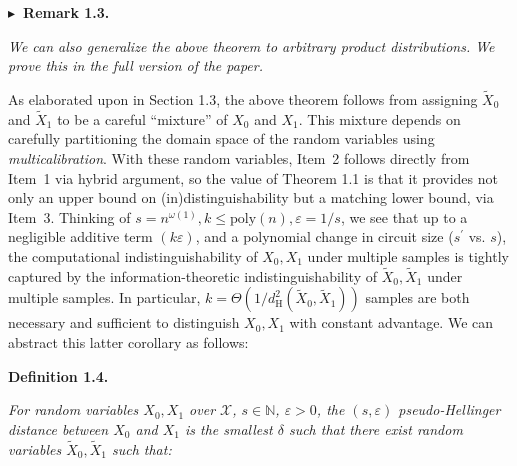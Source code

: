 \documentclass[10pt,a4paper]{article}
\begin{document}




\par\medskip\noindent\textbf{
$\blacktriangleright$ Remark 1.3.
}\par



\emph{We can also generalize the above theorem to arbitrary product distributions. We prove this in the full version of the paper.}\par






As elaborated upon in Section 1.3, the above theorem follows from assigning $\widetilde{X}_{0}$ and $\widetilde{X}_{1}$ to be a careful “mixture” of $X_{0}$ and $X_{1}$. This mixture depends on carefully partitioning the domain space of the random variables using \emph{multicalibration}. With these random variables, Item 2 follows directly from Item 1 via hybrid argument, so the value of Theorem 1.1 is that it provides not only an upper bound on (in)distinguishability but a matching lower bound, via Item 3.
Thinking of $s=n^{\omega(1)},k\leq\mathrm{poly}(n),\varepsilon=1/s$, we see that up to a negligible additive term $(k\varepsilon)$, and a polynomial change in circuit size ($s^{\prime}$ vs. $s$), the computational indistinguishability of $X_{0},X_{1}$ under multiple samples is tightly captured by the information-theoretic indistinguishability of $\widetilde{X}_{0},\widetilde{X}_{1}$ under multiple samples. In particular, $k=\Theta\left(1/d^{2}_{\mathrm{H}}(\widetilde{X}_{0},\widetilde{X}_{1})\right)$ samples are both necessary and sufficient to distinguish $X_{0},X_{1}$ with constant advantage. We can abstract this latter corollary as follows:\par





\par\medskip\noindent\textbf{
\textbf{Definition 1.4}\textbf{.}
}\par



\emph{For random variables $X_{0},X_{1}$ over $\mathcal{X}$, $s\in\mathbb{N}$, $\varepsilon>0$, the $(s,\varepsilon)$ pseudo-Hellinger distance between $X_{0}$ and $X_{1}$ is the smallest $\delta$ such that there exist random variables $\widetilde{X}_{0},\widetilde{X}_{1}$ such that:}\par
\end{document}
